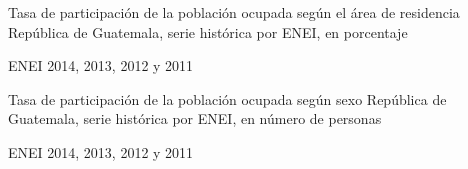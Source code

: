   
  
  
  {%
  }%
  {%
  	Tasa de participación de la población ocupada según el área de residencia} %
  {%
  	República de Guatemala, serie histórica por ENEI, en porcentaje} %
  {%
  	\begin{tikzpicture}[x=1pt,y=1pt]    \end{tikzpicture}}%
  {%
  	ENEI 2014, 2013, 2012 y 2011} %
  
  
 
 {%
 }%
 {%
 	Tasa de participación de la población ocupada según sexo} %
 {%
 	República de Guatemala, serie histórica por ENEI, en número de personas} %
 {%
 	\begin{tikzpicture}[x=1pt,y=1pt]    \end{tikzpicture}}%
 {%
 	ENEI 2014, 2013, 2012 y 2011} %
 
